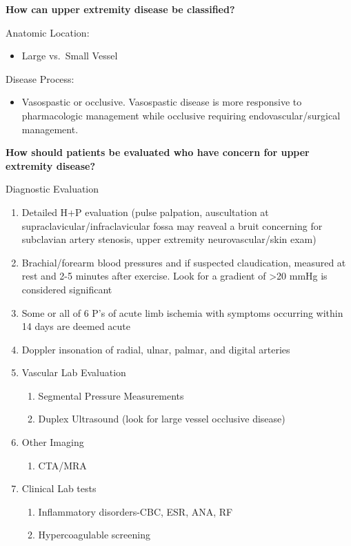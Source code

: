 \documentclass[
]{book}
\providecommand{\tightlist}{%
  \setlength{\itemsep}{0pt}\setlength{\parskip}{0pt}}
\begin{document}
\textbf{How can upper extremity disease be classified?}

Anatomic Location:

\begin{itemize}
\tightlist
\item
  Large vs.~Small Vessel
\end{itemize}

Disease Process:

\begin{itemize}
\tightlist
\item
  Vasospastic or occlusive. Vasospastic disease is more responsive to
  pharmacologic management while occlusive requiring
  endovascular/surgical management.
\end{itemize}

\textbf{How should patients be evaluated who have concern for upper extremity
disease?}

Diagnostic Evaluation

\begin{enumerate}
\def\labelenumi{\arabic{enumi}.}
\item
  Detailed H+P evaluation (pulse palpation, auscultation at
  supraclavicular/infraclavicular fossa may reaveal a bruit concerning
  for subclavian artery stenosis, upper extremity neurovascular/skin
  exam)
\item
  Brachial/forearm blood pressures and if suspected claudication,
  measured at rest and 2-5 minutes after exercise. Look for a gradient
  of \textgreater20 mmHg is considered significant
\item
  Some or all of 6 P's of acute limb ischemia with symptoms occurring
  within 14 days are deemed acute
\item
  Doppler insonation of radial, ulnar, palmar, and digital arteries
\item
  Vascular Lab Evaluation

  \begin{enumerate}
  \def\labelenumii{\arabic{enumii}.}
  \item
    Segmental Pressure Measurements
  \item
    Duplex Ultrasound (look for large vessel occlusive disease)
  \end{enumerate}
\item
  Other Imaging

  \begin{enumerate}
  \def\labelenumii{\arabic{enumii}.}
  \tightlist
  \item
    CTA/MRA
  \end{enumerate}
\item
  Clinical Lab tests

  \begin{enumerate}
  \def\labelenumii{\arabic{enumii}.}
  \item
    Inflammatory disorders-CBC, ESR, ANA, RF
  \item
    Hypercoagulable screening
  \end{enumerate}
\end{enumerate}
\end{document}
